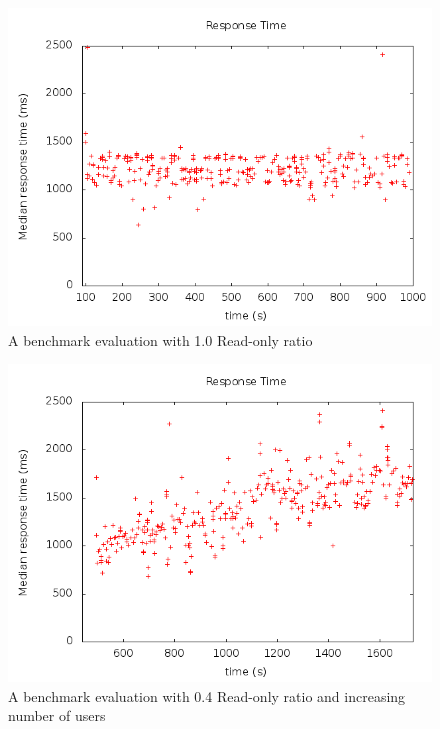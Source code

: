 \begin{figure}[ht]
  \centering %
  \includegraphics[scale=0.5]{src/img/out2.png}
  \caption{A benchmark evaluation with 1.0 Read-only ratio}
\label{figure:graph2}
\end{figure}

\begin{figure}[ht]
  \centering %
  \includegraphics[scale=0.5]{src/img/out3.png}
  \caption{A benchmark evaluation with 0.4 Read-only ratio and increasing number of users}
\label{figure:graph3}
\end{figure}

